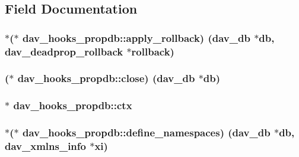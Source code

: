 \subsection{Field Documentation}
\subsubsection[{\texorpdfstring{apply\+\_\+rollback}{apply_rollback}}]{$\ast$($\ast$ dav\+\_\+hooks\+\_\+propdb\+::apply\+\_\+rollback) ({\bf dav\+\_\+db} $\ast$db, {\bf dav\+\_\+deadprop\+\_\+rollback} $\ast$rollback)}\hypertarget{structdav__hooks__propdb_ac4331dd19b3bfbd2f906a4d641aa7c1d}{}\label{structdav__hooks__propdb_ac4331dd19b3bfbd2f906a4d641aa7c1d}
\subsubsection[{\texorpdfstring{close}{close}}]{($\ast$ dav\+\_\+hooks\+\_\+propdb\+::close) ({\bf dav\+\_\+db} $\ast$db)}\hypertarget{structdav__hooks__propdb_a5bb9430a24c7237b21250717440abf91}{}\label{structdav__hooks__propdb_a5bb9430a24c7237b21250717440abf91}
\subsubsection[{\texorpdfstring{ctx}{ctx}}]{$\ast$ dav\+\_\+hooks\+\_\+propdb\+::ctx}\hypertarget{structdav__hooks__propdb_ad36446528ace0ec1614928ae09aa84be}{}\label{structdav__hooks__propdb_ad36446528ace0ec1614928ae09aa84be}
\subsubsection[{\texorpdfstring{define\+\_\+namespaces}{define_namespaces}}]{$\ast$($\ast$ dav\+\_\+hooks\+\_\+propdb\+::define\+\_\+namespaces) ({\bf dav\+\_\+db} $\ast$db, {\bf dav\+\_\+xmlns\+\_\+info} $\ast$xi)}\hypertarget{structdav__hooks__propdb_ab54e309d9a5269e3bb3bd42a2198d42c}{}\label{structdav__hooks__propdb_ab54e309d9a5269e3bb3bd42a2198d42c}
